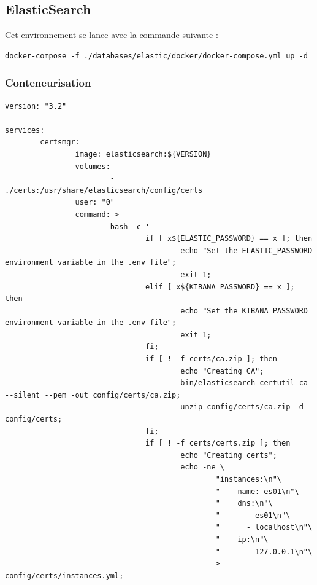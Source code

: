 \documentclass[a4paper,12pt]{article}
\begin{document}
	\subsection{ElasticSearch} \label{ES}
		Cet environnement se lance avec la commande suivante :
		\begin{verbatim}
docker-compose -f ./databases/elastic/docker/docker-compose.yml up -d		
		\end{verbatim}
		
		\subsubsection{Conteneurisation}
			\begin{lstlisting}[title=DockerCompose]
version: "3.2"

services:
        certsmgr:
                image: elasticsearch:${VERSION}
                volumes:
                        - ./certs:/usr/share/elasticsearch/config/certs
                user: "0"
                command: >
                        bash -c '
                                if [ x${ELASTIC_PASSWORD} == x ]; then
                                        echo "Set the ELASTIC_PASSWORD environment variable in the .env file";
                                        exit 1;
                                elif [ x${KIBANA_PASSWORD} == x ]; then
                                        echo "Set the KIBANA_PASSWORD environment variable in the .env file";
                                        exit 1;
                                fi;
                                if [ ! -f certs/ca.zip ]; then
                                        echo "Creating CA";
                                        bin/elasticsearch-certutil ca --silent --pem -out config/certs/ca.zip;
                                        unzip config/certs/ca.zip -d config/certs;
                                fi;
                                if [ ! -f certs/certs.zip ]; then
                                        echo "Creating certs";
                                        echo -ne \
                                                "instances:\n"\
                                                "  - name: es01\n"\
                                                "    dns:\n"\
                                                "      - es01\n"\
                                                "      - localhost\n"\
                                                "    ip:\n"\
                                                "      - 127.0.0.1\n"\
                                                > config/certs/instances.yml;

\end{lstlisting}
\end{document}
